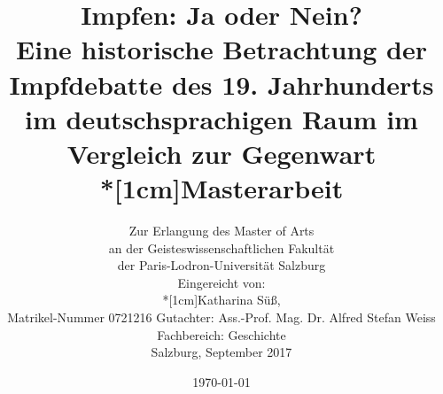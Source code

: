 \title{
	Impfen: Ja oder Nein? \\
	Eine historische Betrachtung der Impfdebatte des 19. Jahrhunderts im deutschsprachigen Raum im Vergleich zur Gegenwart
	\\*[1cm]Masterarbeit\\
}
\author{Zur Erlangung des Master of Arts\\
an der Geisteswissenschaftlichen Fakultät\\
der Paris-Lodron-Universität Salzburg\\
Eingereicht von:\\
*[1cm]Katharina Süß, \\Matrikel-Nummer 0721216
Gutachter: Ass.-Prof. Mag. Dr. Alfred Stefan Weiss\\
Fachbereich: Geschichte\\
Salzburg, September 2017
}
\date{\today}
